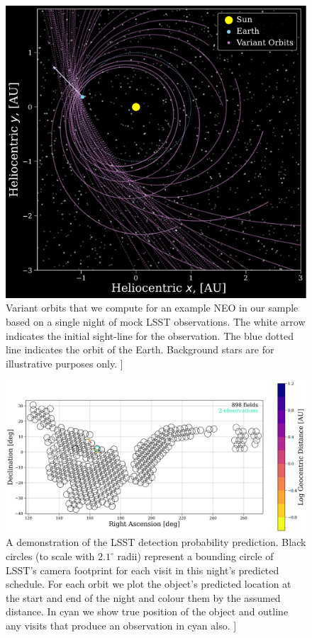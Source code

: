 \documentclass[twocolumn]{aastex631}
\newcommand{\todo}[1]{{\color{red}{[TODO: #1}]}}
\begin{document}
\begin{figure}[htb]
    \centering
    \includegraphics[width=\columnwidth]{orbits_example.pdf}
    \caption{Variant orbits that we compute for an example NEO in our sample based on a single night of mock LSST observations. The white arrow indicates the initial sight-line for the observation. The blue dotted line indicates the orbit of the Earth. Background stars are for illustrative purposes only. \todo{unsure if this plot belongs, but it helped me visualise the orbits}}
    \label{fig:orbits}
\end{figure}

\begin{figure}[htb]
    \centering
    \includegraphics[width=\columnwidth]{methods_placeholder.png}
    \caption{A demonstration of the LSST detection probability prediction. Black circles (to scale with $2.1^{\circ}$ radii) represent a bounding circle of LSST's camera footprint for each visit in this night's predicted schedule. For each orbit we plot the object's predicted location at the start and end of the night and colour them by the assumed distance. In cyan we show true position of the object and outline any visits that produce an observation in cyan also. \todo{pick a nice object for this plot, also try molleweide projection}}
    \label{fig:circles}
\end{figure}
\end{document}
